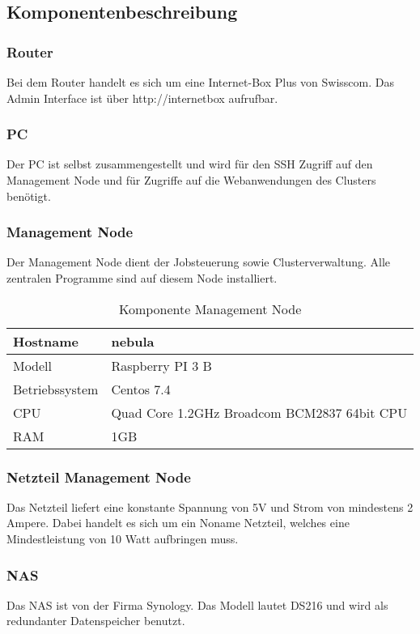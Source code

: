 \subsection{Komponentenbeschreibung}
\subsubsection{Router}

Bei dem Router handelt es sich um eine Internet-Box Plus von Swisscom. Das Admin Interface ist über http://internetbox aufrufbar.

\subsubsection{PC}
Der PC ist selbst zusammengestellt und wird für den SSH Zugriff auf den Management Node und für Zugriffe auf die Webanwendungen des Clusters benötigt.

\subsubsection{Management Node}
Der Management Node dient der Jobsteuerung sowie Clusterverwaltung. Alle zentralen Programme sind auf diesem Node installiert.

\begin{table}[H]
\centering
\begin{tabular}{|l|l|}
\hline
Hostname & nebula \\\hline
Modell & Raspberry PI 3 B\\\hline
Betriebssystem & Centos 7.4 \\\hline
CPU & Quad Core 1.2GHz Broadcom BCM2837 64bit CPU \\\hline
RAM & 1GB  \\\hline
\end{tabular}
\caption{Komponente Management Node}
\end{table}

\subsubsection{Netzteil Management Node}
Das Netzteil liefert eine konstante Spannung von 5V und Strom von mindestens 2 Ampere. Dabei handelt es sich um ein Noname Netzteil, welches eine Mindestleistung von 10 Watt aufbringen muss.

\subsubsection{NAS}
Das NAS ist von der Firma Synology. Das Modell lautet DS216 und wird als redundanter Datenspeicher benutzt.


